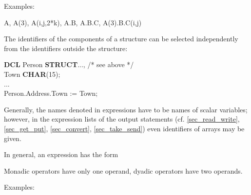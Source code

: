 


Examples:

A, A(3), A(i,j,2*k), A.B, A.B.C, A(3).B.C(i,j)

The identifiers of the components of a structure can be selected
independently from the identifiers outside the structure:

{\bf DCL} Person {\bf STRUCT}..., /* see above */ \\
\x Town {\bf CHAR}(15);\\
\x ...\\
Person.Address.Town := Town;

Generally, the names denoted in expressions have to be names of scalar
variables; however, in the expression lists of the output statements
(cf. \ref{sec_read_write}, \ref{sec_get_put}, \ref{sec_convert}, 
\ref{sec_take_send}) even identifiers of arrays may be given.

In general, an expression has the form



Monadic operators have only one operand, dyadic operators have two
operands.









Examples:

